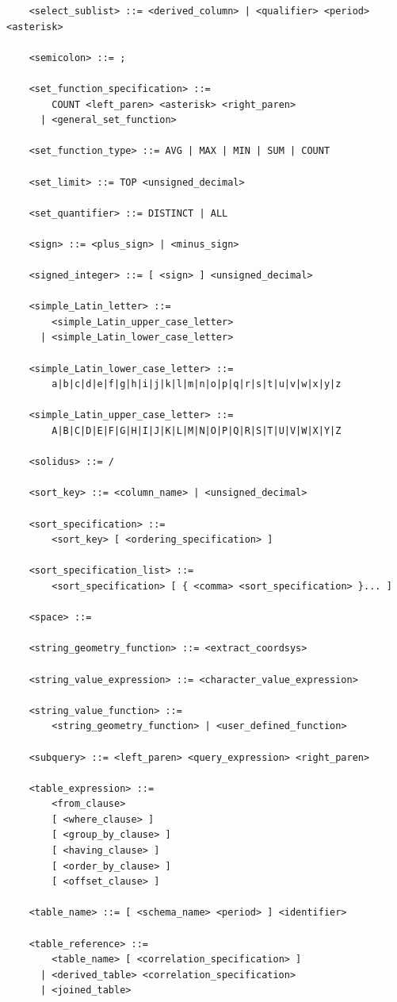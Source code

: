 \documentclass[11pt,a4paper]{ivoa}
\begin{document}
\begin{verbatim}
    <select_sublist> ::= <derived_column> | <qualifier> <period> <asterisk>

    <semicolon> ::= ;

    <set_function_specification> ::=
        COUNT <left_paren> <asterisk> <right_paren>
      | <general_set_function>

    <set_function_type> ::= AVG | MAX | MIN | SUM | COUNT

    <set_limit> ::= TOP <unsigned_decimal>

    <set_quantifier> ::= DISTINCT | ALL

    <sign> ::= <plus_sign> | <minus_sign>

    <signed_integer> ::= [ <sign> ] <unsigned_decimal>

    <simple_Latin_letter> ::=
        <simple_Latin_upper_case_letter>
      | <simple_Latin_lower_case_letter>

    <simple_Latin_lower_case_letter> ::=
        a|b|c|d|e|f|g|h|i|j|k|l|m|n|o|p|q|r|s|t|u|v|w|x|y|z

    <simple_Latin_upper_case_letter> ::=
        A|B|C|D|E|F|G|H|I|J|K|L|M|N|O|P|Q|R|S|T|U|V|W|X|Y|Z

    <solidus> ::= /

    <sort_key> ::= <column_name> | <unsigned_decimal>

    <sort_specification> ::=
        <sort_key> [ <ordering_specification> ]

    <sort_specification_list> ::=
        <sort_specification> [ { <comma> <sort_specification> }... ]

    <space> ::=

    <string_geometry_function> ::= <extract_coordsys>

    <string_value_expression> ::= <character_value_expression>

    <string_value_function> ::=
        <string_geometry_function> | <user_defined_function>

    <subquery> ::= <left_paren> <query_expression> <right_paren>

    <table_expression> ::=
        <from_clause>
        [ <where_clause> ]
        [ <group_by_clause> ]
        [ <having_clause> ]
        [ <order_by_clause> ]
        [ <offset_clause> ]

    <table_name> ::= [ <schema_name> <period> ] <identifier>

    <table_reference> ::=
        <table_name> [ <correlation_specification> ]
      | <derived_table> <correlation_specification>
      | <joined_table>


\end{verbatim}
\end{document}
